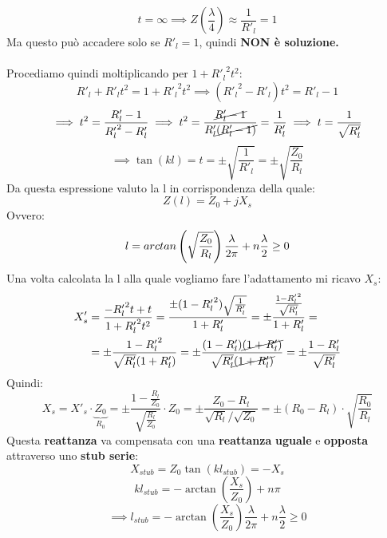 \begin{equation*}
    t=\infty \implies Z\left(\frac{\lambda}{4}\right) \approx \frac{1}{R'_l} = 1
\end{equation*}
Ma questo può accadere solo se $R'_l = 1$, quindi\textbf{ NON è soluzione.}\\ \\
Procediamo quindi moltiplicando per $1 + {R'_l}^2 t^2$:
\begin{equation*}
    R'_l + {R'_l} t^2= 1 + {R'_l}^2 t^2 \implies ( {R'_l}^2 - R'_l) t^2 = R'_l -1
\end{equation*}
\begin{equation*}
    \implies t^2 = \frac{R'_l -1}{{R'_l}^2 - R'_l} \implies t^2 = \frac{\cancel{R'_l -1}}{R'_l\cancel{({R'_l} - 1)}} = \frac{1}{R'_l} \implies t = \frac{1}{\sqrt{R'_l}}
\end{equation*}
\begin{equation*}
    \implies \tan(kl) = t = \pm \sqrt{\frac{1}{{R'_l}}} = \pm \sqrt{\frac{Z_0}{R_l}}
\end{equation*}
Da questa espressione valuto la l in corrispondenza della quale:
\begin{equation*}
    Z(l) = Z_0 + j X_s
\end{equation*}
Ovvero:
\begin{equation*}
    l = \\arctan\left(\sqrt{\frac{Z_0}{R_l}}\right) \frac{\lambda}{2\pi} + n \frac{\lambda}{2} \geq 0
\end{equation*}
Una volta calcolata la l alla quale vogliamo fare l'adattamento mi ricavo $X_s$:
\begin{equation*}
    \begin{aligned}
    X'_s &= \frac{- {R'_l}^2 t +t}{1 + {R'_l}^2 t^2} = \frac{\pm (1 - {R'_l}^2) \sqrt{\frac{1}{R'_l}}}{1 + R'_l} = \pm \frac{\frac{1 - {R'_l}^2}{\sqrt{R'_l}}}{1 + R'_l} =\\
    &= \pm \frac{1 -{R'_l}^2 }{\sqrt{R'_l} (1 +{R'_l})} = \pm \frac{(1 -{R'_l})\cancel{(1 +{R'_l})}}{\sqrt{R'_l} \cancel{(1 +{R'_l})}} = \pm \frac{1 - {R'_l}}{\sqrt{R'_l}}
    \end{aligned}
\end{equation*}
Quindi:
\begin{equation*}
    X_s = X'_s \cdot \underbrace{Z_0}_{R_0} = \pm \frac{1 - \frac{R_l}{Z_0}}{\sqrt{\frac{R_l}{Z_0}}} \cdot Z_0 = \pm \frac{Z_0 - R_l}{\sqrt{R_l} / \sqrt{Z_0}} = \pm (R_0 - R_l) \cdot \sqrt{\frac{R_0}{R_l}}
\end{equation*}
Questa \textbf{reattanza} va compensata con una \textbf{reattanza} \textbf{uguale} e \textbf{opposta} attraverso uno \textbf{stub serie}:
\begin{equation*}
    X_{stub} = Z_0 \tan(kl_{stub}) = - X_s
\end{equation*}
\begin{equation*}
    kl_{stub} = -\arctan\left(\frac{X_s}{Z_0}\right) + n\pi
\end{equation*}
\begin{equation*}
   \implies l_{stub} = -\arctan\left(\frac{X_s}{Z_0}\right) \frac{\lambda}{2\pi} + n \frac{\lambda}{2} \geq 0
\end{equation*}

